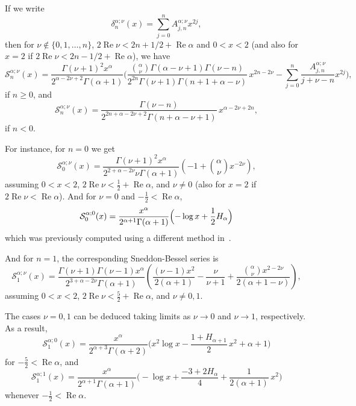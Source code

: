 \documentclass[10pt,leqno,a4paper]{article}
\theoremstyle{plain}
\newcommand{\Ss}{\mathcal{S}}
\renewcommand{\Re}{\operatorname{Re}}
\numberwithin{equation}{section}
\begin{document}
If we write
\begin{equation}
\label{coed1v}
   \delta_n^{\alpha;\nu}(x) = \sum_{j=0}^n A_{j,n}^{\alpha;\nu} x^{2j} ,
\end{equation}
then for $\nu \notin \{0,1,\dots, n\}$, $2\Re \nu<2n+1/2+\Re \alpha$ and $0< x< 2$
(and also for $x=2$ if $2\Re \nu <2n-1/2+\Re \alpha$), we have
\begin{equation}
\label{sod2i1v}
   \Ss_{n}^{\alpha;\nu}(x)
   = \frac{\Gamma(\nu+1)^2 x^\alpha }{2^{\alpha-2\nu+2}\Gamma(\alpha+1)}
   \bigg(
   \frac{\binom{\alpha}{\nu}\Gamma(\alpha-\nu+1)\Gamma(\nu-n)}
   {2^{2n}\Gamma(\nu+1)\Gamma(n+1+\alpha-\nu)} \, x^{2n-2\nu}
   - \sum_{j=0}^n \frac{A_{j,n}^{\alpha;\nu}}{j+\nu - n} x^{2j}
   \bigg),
\end{equation}
if $n\geq 0$, and
\[
   \Ss_{n}^{\alpha;\nu}(x)
   = \frac{\Gamma(\nu-n) }{2^{2n+\alpha-2\nu+2}\Gamma(n+\alpha-\nu+1)}
   \, x^{\alpha-2\nu+2n},
\]
if $n<0$.

For instance, for $n=0$ we get
\[
   \Ss_0^{\alpha;\nu}(x)
   = \frac{\Gamma(\nu+1)^2 x^\alpha}{2^{2+\alpha-2\nu}\nu\Gamma(\alpha+1)}
   \left(- 1 + \binom{\alpha}{\nu}x^{-2\nu} \right),
\]
assuming $0 < x < 2$, $2\Re \nu < \frac{1}{2} + \Re \alpha$, and $\nu \neq 0$ (also for $x=2$ if $ 2\Re \nu < \Re \alpha$). And for $\nu=0$ and $-\frac{1}{2} < \Re \alpha$,
\[
   \Ss_0^{\alpha;0}(x)
   = \frac{x^\alpha }{2^{\alpha+1} \Gamma(\alpha+1)}
   \Bigl(
   -\log x + \frac{1}{2} H_\alpha
   \Bigr)
\]
which was previously computed using a different method in~\cite[(4)]{DPVa}.

And for $n=1$, the corresponding Sneddon-Bessel series is
\[
   \Ss_1^{\alpha;\nu}(x)
   = \frac{\Gamma(\nu+1)\Gamma(\nu-1)x^\alpha}{2^{3+\alpha-2\nu}\Gamma(\alpha+1)}
   \left(
   \frac{(\nu-1)x^2}{2(\alpha+1)} - \frac{\nu}{\nu+1}
   + \frac{\binom{\alpha}{\nu}x^{2-2\nu}}{2(\alpha+1-\nu) }
   \right),
\]
assuming $0 < x < 2$, $2\Re \nu < \frac{5}{2} +\Re \alpha$, and $\nu \neq 0,1$.

The cases $\nu = 0,1$ can be deduced taking limits as $\nu\to 0$ and $\nu\to 1$, respectively. As a result,
\[
   \Ss_1^{\alpha;0}(x)
   = \frac{x^\alpha}{2^{\alpha+3} \Gamma(\alpha+2)} \biggl(
   x^2 \log x - \frac{1 + H_{\alpha+1}}{2}\, x^2 + \alpha+1
   \biggr)
\]
for $-\frac{5}{2} < \Re \alpha$, and
\[
   \Ss_1^{\alpha;1}(x)
   = \frac{x^\alpha }{2^{\alpha+1} \Gamma(\alpha+1)}
   \biggl(
   - \log x + \frac{-3+2H_\alpha}{4} + \frac{1}{2(\alpha+1)} \,x^{2}
   \biggr)
\]
whenever $-\frac{1}{2} < \Re \alpha$.

\end{document}
